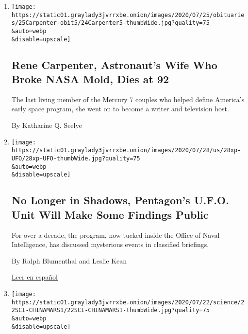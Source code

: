 \begin{enumerate}
\def\labelenumi{\arabic{enumi}.}
\item
  \href{/2020/07/24/us/rene-carpenter-dead.html}{}

  \texttt{[image: https://static01.graylady3jvrrxbe.onion/images/2020/07/25/obituaries/25Carpenter-obit5/24Carpenter5-thumbWide.jpg?quality=75\\\&auto=webp\\\&disable=upscale]}

  \hypertarget{rene-carpenter-astronauts-wife-who-broke-nasa-mold-dies-at-92}{%
  \subsection{Rene Carpenter, Astronaut's Wife Who Broke NASA Mold, Dies
  at
  92}\label{rene-carpenter-astronauts-wife-who-broke-nasa-mold-dies-at-92}}

  The last living member of the Mercury 7 couples who helped define
  America's early space program, she went on to become a writer and
  television host.

  By Katharine Q. Seelye
\item
  \href{/2020/07/23/us/politics/pentagon-ufo-harry-reid-navy.html}{}

  \texttt{[image: https://static01.graylady3jvrrxbe.onion/images/2020/07/28/us/28xp-UFO/28xp-UFO-thumbWide.jpg?quality=75\\\&auto=webp\\\&disable=upscale]}

  \hypertarget{no-longer-in-shadows-pentagons-ufo-unit-will-make-some-findings-public}{%
  \subsection{No Longer in Shadows, Pentagon's U.F.O. Unit Will Make
  Some Findings
  Public}\label{no-longer-in-shadows-pentagons-ufo-unit-will-make-some-findings-public}}

  For over a decade, the program, now tucked inside the Office of Naval
  Intelligence, has discussed mysterious events in classified briefings.

  By Ralph Blumenthal and Leslie Kean

  \href{https://www.nytimes3xbfgragh.onion/es/2020/07/24/espanol/ovnis-pentagono.html}{Leer
  en español}
\item
  \href{/2020/07/22/science/china-mars-mission.html}{}

  \texttt{[image: https://static01.graylady3jvrrxbe.onion/images/2020/07/22/science/22SCI-CHINAMARS1/22SCI-CHINAMARS1-thumbWide.jpg?quality=75\\\&auto=webp\\\&disable=upscale]}


\end{enumerate}
